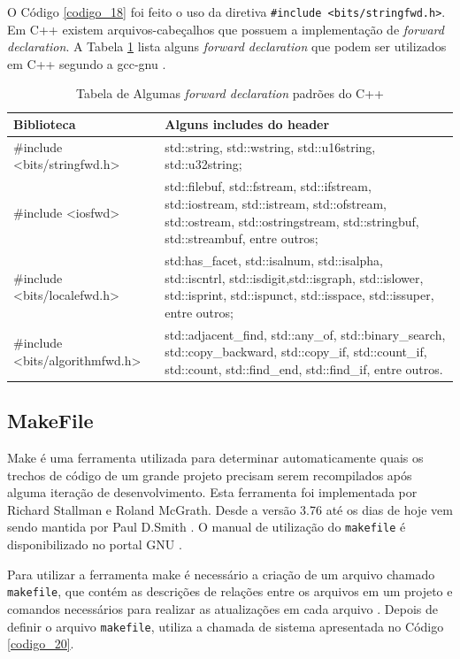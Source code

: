 O Código \ref{codigo_18} foi feito o uso da diretiva \texttt{\#include
 <bits/stringfwd.h>}. Em C++  existem arquivos-cabeçalhos que possuem a
 implementação de \textit{forward declaration}. A Tabela \ref{tab:tabela_04} lista 
 alguns \textit{forward declaration} que podem ser utilizados em C++ segundo
 a gcc-gnu \cite{gccapi}.

\begin{table}[h]
    \centering
	\caption {Tabela de Algumas \textit{forward declaration} padrões do C++}
    \label{tab:tabela_04}
	\begin{tabularx}{0.95\textwidth}{>{\ttfamily}l>{\ttfamily}X}
	\toprule
	\textbf{Biblioteca} & \textbf{Alguns includes do header}\\
	\midrule
	\#include <bits/stringfwd.h> & std::string, std::wstring, std::u16string, std::u32string; \\
	\midrule
	\#include <iosfwd>          & std::filebuf, std::fstream, std::ifstream, std::iostream, std::istream, std::ofstream, std::ostream, std::ostringstream, std::stringbuf, std::streambuf, entre outros;\\
	\midrule
	\#include <bits/localefwd.h> & std:has\_facet, std::isalnum, std::isalpha, std::iscntrl, std::isdigit,std::isgraph, std::islower, std::isprint, std::ispunct, std::isspace, std::issuper, entre outros;\\
	\midrule
	\#include <bits/algorithmfwd.h> & std::adjacent\_find, std::any\_of, std::binary\_search, std::copy\_backward, std::copy\_if, std::count\_if, std::count, std::find\_end, std::find\_if, entre outros.\\
	\bottomrule
	\end{tabularx}
\end{table}


\subsection{MakeFile}\label{Makefile_section}


Make é uma ferramenta utilizada para determinar automaticamente quais
 os trechos de código de um grande projeto precisam serem recompilados
 após alguma iteração de desenvolvimento. Esta ferramenta foi implementada
 por Richard Stallman e Roland McGrath. Desde a versão 3.76 até os dias de
 hoje vem sendo mantida por Paul D.Smith \cite{Lasca2}. O manual de utilização do \texttt{makefile}
 é disponibilizado no portal GNU \cite{ref45}.

Para utilizar a ferramenta make é necessário a criação de um arquivo chamado
 \texttt{makefile}, que contém as descrições de relações entre os arquivos em um projeto
 e comandos necessários para realizar as atualizações em cada arquivo \cite{Lasca2}.
 Depois de definir o arquivo \texttt{makefile}, utiliza a chamada de sistema apresentada 
no Código \ref{codigo_20}.

